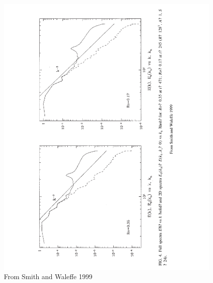 \documentclass[12pt]{article}
\begin{document}
\begin{figure}
\begin{center}
\includegraphics[angle=-90,width=6.in]{SW99Fig4}
\caption{From Smith and Waleffe 1999}
\label{fig:SW99Fig4}
\end{center}
\end{figure}
\end{document}
